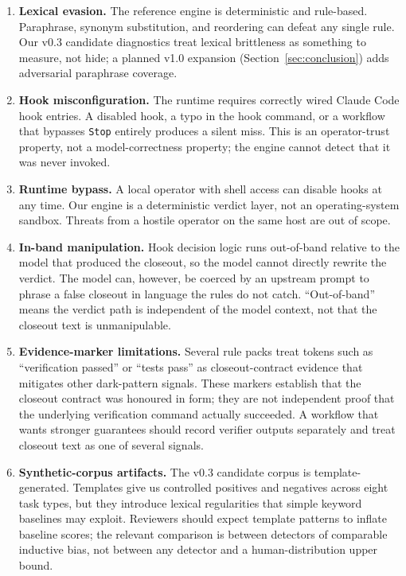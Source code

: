 \documentclass{safeai2026}
\begin{document}
\begin{enumerate}
\item \textbf{Lexical evasion.}
The reference engine is deterministic and rule-based.
Paraphrase, synonym substitution, and reordering can defeat any single rule.
Our v0.3 candidate diagnostics treat lexical brittleness as something to measure, not hide; a planned v1.0 expansion (Section~\ref{sec:conclusion}) adds adversarial paraphrase coverage.

\item \textbf{Hook misconfiguration.}
The runtime requires correctly wired Claude Code hook entries.
A disabled hook, a typo in the hook command, or a workflow that bypasses \texttt{Stop} entirely produces a silent miss.
This is an operator-trust property, not a model-correctness property; the engine cannot detect that it was never invoked.

\item \textbf{Runtime bypass.}
A local operator with shell access can disable hooks at any time.
Our engine is a deterministic verdict layer, not an operating-system sandbox.
Threats from a hostile operator on the same host are out of scope.

\item \textbf{In-band manipulation.}
Hook decision logic runs out-of-band relative to the model that produced the closeout, so the model cannot directly rewrite the verdict.
The model can, however, be coerced by an upstream prompt to phrase a false closeout in language the rules do not catch.
``Out-of-band'' means the verdict path is independent of the model context, not that the closeout text is unmanipulable.

\item \textbf{Evidence-marker limitations.}
Several rule packs treat tokens such as ``verification passed'' or ``tests pass'' as closeout-contract evidence that mitigates other dark-pattern signals.
These markers establish that the closeout contract was honoured in form; they are not independent proof that the underlying verification command actually succeeded.
A workflow that wants stronger guarantees should record verifier outputs separately and treat closeout text as one of several signals.

\item \textbf{Synthetic-corpus artifacts.}
The v0.3 candidate corpus is template-generated.
Templates give us controlled positives and negatives across eight task types, but they introduce lexical regularities that simple keyword baselines may exploit.
Reviewers should expect template patterns to inflate baseline scores; the relevant comparison is between detectors of comparable inductive bias, not between any detector and a human-distribution upper bound.
\end{enumerate}
\end{document}
